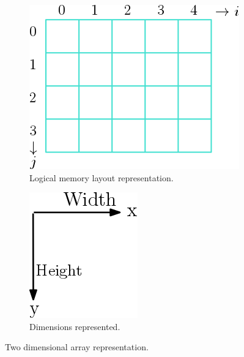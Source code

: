 \begin{figure}[htp]
  \centering
  \begin{subfigure}[b]{0.35\textwidth}
    \includegraphics[width=\textwidth]{img/array2D}
    \caption{Logical memory layout representation.}
  \label{fig:2a}
  \end{subfigure}
  \hspace*{4cm}
  \begin{subfigure}[b]{0.25\textwidth}
    \includegraphics[width=\textwidth]{img/arrow2D}
    \caption{Dimensions represented.}
    \label{fig:2b}
  \end{subfigure}
  \caption{Two dimensional array representation.}
  \label{fig:2D}
\end{figure}

